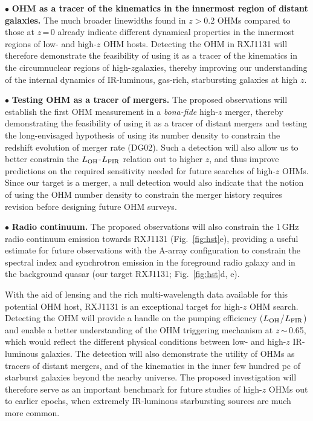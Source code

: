 \documentclass[letterpaper,11pt]{article}
\newcommand{\LFIR}{\mbox{$L_{\rm FIR}$}\xspace}
\newcommand{\LOH}{$L_{\rm OH}$\xspace}
\newcommand{\Fig}[1]{Fig.~\ref{fig:#1}}
\newcommand{\eq}{\,=\,}
\newcommand{\ssim}{\,$\sim$\,}
\newcommand{\highz}{high-$z$\space}
\newcommand{\obs}{observations\xspace}
\begin{document}
\noindent $\bullet$ {\bf OHM as a tracer of the kinematics in the innermost region of distant galaxies.}
The much broader linewidths found in $z$$>$0.2 OHMs \citep[typically at least a factor of $>$2 in FWHM;][DG02]{Baan92a}
compared to those at $z$\eq0 already indicate
different dynamical properties in the innermost regions of low- and high-$z$ OHM hosts.
Detecting the OHM in RXJ1131 will therefore demonstrate the feasibility of
using it as a tracer of the kinematics in the circumnuclear regions of \highz galaxies, thereby improving
our understanding of the internal dynamics of IR-luminous, gas-rich, starbursting galaxies at high $z$.

\noindent $\bullet$ {\bf Testing OHM as a tracer of mergers.}
The proposed \obs will establish the first OHM measurement in a {\it bona-fide} high-$z$ merger, thereby
demonstrating the feasibility of using it as a tracer of distant mergers and
testing the long-envisaged hypothesis of using its number density to constrain
the redshift evolution of merger rate (DG02).
Such a detection will also allow us to better constrain the
\LOH-\LFIR relation out to higher $z$, %
and thus improve predictions on the required sensitivity needed for future searches of high-$z$ OHMs.
Since our target is a merger,
a null detection would also indicate that the notion of
using the OHM number density to constrain the merger history requires revision before designing future OHM surveys.

\noindent $\bullet$ {\bf Radio continuum.}
The proposed \obs will also constrain the 1\,GHz radio continuum emission
towards RXJ1131 (\Fig{hst}e), providing a useful estimate for future observations with the A-array configuration to
constrain the spectral index and synchrotron emission in the foreground radio galaxy 
and in the background quasar (our target RXJ1131; \Fig{hst}d, e).

\noindent
With the aid of lensing and the rich multi-wavelength data available for this potential OHM host, RXJ1131 is an exceptional target
for high-$z$ OHM search. 
Detecting the OHM will provide a handle on the pumping efficiency (\LOH/\LFIR)
and enable a better understanding of the OHM triggering mechanism at $z$\ssim0.65, which
would reflect the different physical conditions between low- and high-$z$ IR-luminous galaxies.
The detection will also demonstrate the utility of OHMs as tracers of distant mergers, and
of the kinematics in the inner few hundred pc
of starburst galaxies beyond the nearby universe. %
The proposed investigation will therefore serve as an
important benchmark for future studies of high-$z$ OHMs out to earlier epochs,
when extremely IR-luminous starbursting sources are much more common.
\end{document}
